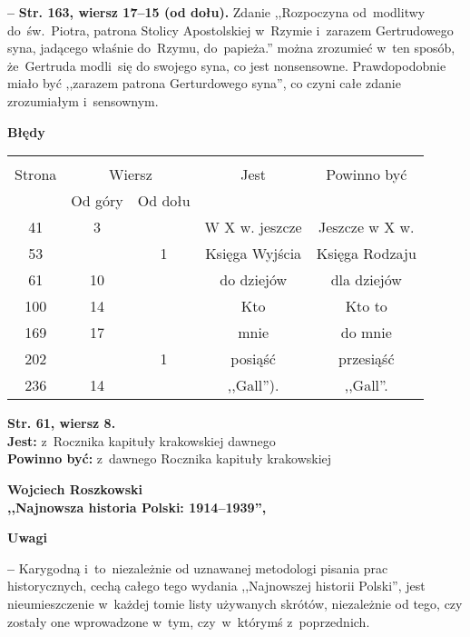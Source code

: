 \documentclass[a4paper,11pt]{article}
\newcommand{\spaceTwo}{2em}
\newcommand{\spaceFour}{0.5em}
\newcommand{\tb}{\textbf}
\newcommand{\noi}{\noindent}
\newcommand{\start}{\noi \tb{--} {}}
\newcommand{\Center}[1]{\begin{center} #1 \end{center}}
\newcommand{\CenterTB}[1]{\Center{\tb{#1}}}
\newcommand{\StrWg}[2]{\tb{Str. #1, wiersz #2.}}
\newcommand{\StrWd}[2]{\tb{Str. #1, wiersz #2 (od dołu).}}
\newcommand{\Jest}{\tb{Jest: }}
\newcommand{\Pow}{\tb{Powinno być: }}
\newcommand{\Work}[1]{ \begin{center} {\large \tb{#1}} \end{center} }
\begin{document}
\vspace{\spaceFour}


\start \StrWd{163}{17--15} Zdanie ,,Rozpoczyna od~modlitwy
do~św.~Piotra, patrona Stolicy Apostolskiej w~Rzymie i~zarazem
Gertrudowego syna, jadącego właśnie do~Rzymu, do~papieża.'' można
zrozumieć w~ten sposób, że~Gertruda modli~się do swojego syna, co jest
nonsensowne. Prawdopodobnie miało być ,,zarazem patrona Gerturdowego
syna'', co czyni całe zdanie zrozumiałym i~sensownym.


\CenterTB{Błędy}
\begin{center}
  \begin{tabular}{|c|c|c|c|c|}
    \hline
    & \multicolumn{2}{c|}{} & & \\
    Strona & \multicolumn{2}{c|}{Wiersz}& Jest & Powinno być \\ \cline{2-3}
    & Od góry & Od dołu &  &  \\ \hline
    41 & 3 & & W X w. jeszcze & Jeszcze w X w. \\
    53 & & 1 & Księga Wyjścia & Księga Rodzaju \\
    61 & 10 & & do dziejów & dla dziejów \\
    100 & 14 & & Kto & Kto to \\
    169 & 17 & & mnie & do mnie \\
    202 & & 1 & posiąść & przesiąść \\
    236 & 14 & & ,,Gall''). & ,,Gall''. \\
    \hline
  \end{tabular}
\end{center}
\noi
\StrWg{61}{8} \\
\Jest z~Rocznika kapituły krakowskiej dawnego \\
\Pow z~dawnego Rocznika kapituły krakowskiej \\

\vspace{\spaceTwo}





\Work{
  Wojciech Roszkowski \\
  ,,Najnowsza historia Polski: 1914--1939'',
  \cite{RoszkowskiNajnowszaHistoriaPolski39-45Wyd11} }


\CenterTB{Uwagi}

\start Karygodną i~to~niezależnie od uznawanej metodologi pisania prac
historycznych, cechą całego tego wydania ,,Najnowszej historii
Polski'', jest nieumieszczenie w~każdej tomie listy używanych skrótów,
niezależnie od tego, czy zostały one wprowadzone w~tym, czy~w~którymś
z~poprzednich.
\end{document}
